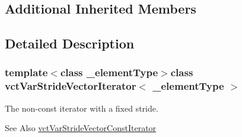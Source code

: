 \subsection*{Additional Inherited Members}


\subsection{Detailed Description}
\subsubsection*{template$<$class \-\_\-element\-Type$>$class vct\-Var\-Stride\-Vector\-Iterator$<$ \-\_\-element\-Type $>$}

The non-\/const iterator with a fixed stride. \begin{DoxySeeAlso}{See Also}
\hyperlink{classvct_var_stride_vector_const_iterator}{vct\-Var\-Stride\-Vector\-Const\-Iterator} 
\end{DoxySeeAlso}


